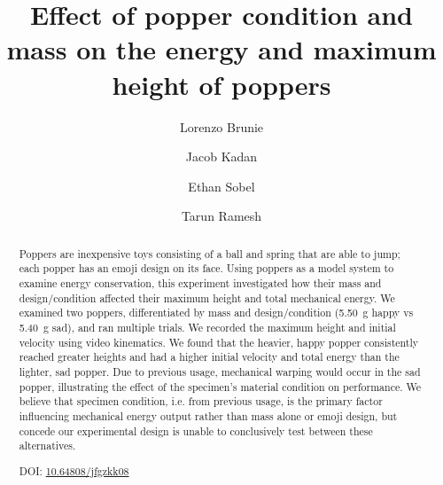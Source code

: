 \documentclass[reprint,amsmath,amssymb,aps,twoside]{revtex4-2} %
\begin{document}
\setcounter{page}{114} %

\title{Effect of popper condition and mass on the energy and maximum height of poppers}
\author{Lorenzo Brunie}
\author{Jacob Kadan}
\author{Ethan Sobel}
\author{Tarun Ramesh}


\begin{abstract}
Poppers are inexpensive toys consisting of a ball and spring that are able to jump; each popper has an emoji design on its face.  Using poppers as a model system to examine energy conservation, this experiment investigated how their mass and design/condition affected their maximum height and total mechanical energy.  We examined two poppers, differentiated by mass and design/condition (\qty{5.50}{\gram} happy vs \qty{5.40}{\gram} sad), and ran multiple trials. We recorded the maximum height and initial velocity using video kinematics.  We found that the heavier, happy popper consistently reached greater heights and had a higher initial velocity and total energy than the lighter, sad popper. Due to previous usage, mechanical warping would occur in the sad popper, illustrating the effect of the specimen's material condition on performance. We believe that specimen condition, i.e. from previous usage, is the primary factor influencing mechanical energy output rather than mass alone or emoji design, but concede our experimental design is unable to conclusively test between these alternatives.

\vspace{1em} %
\noindent DOI: \href{https://doi.org/10.64804/jfgzkk08}{10.64808/jfgzkk08}
\end{abstract}

\end{document}
